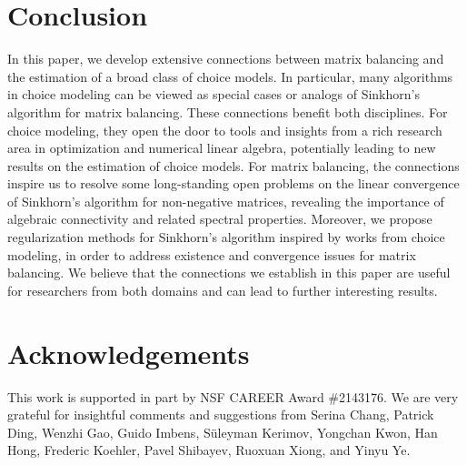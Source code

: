 \section{Conclusion}
In this paper, we develop extensive connections between matrix balancing and the estimation of a broad class of choice models. In particular, many algorithms in choice modeling can be viewed as special cases or analogs of Sinkhorn's algorithm for matrix balancing. These connections benefit both disciplines. For choice modeling, they open the door to tools and insights from a rich research area in optimization and numerical linear algebra, potentially leading to new  results on the estimation of choice models. For matrix balancing, the connections inspire us to resolve some long-standing open problems on the linear convergence of Sinkhorn's algorithm for non-negative matrices, revealing the importance of algebraic connectivity and related spectral properties. Moreover, we propose regularization methods for Sinkhorn's algorithm inspired by works from choice modeling, in order to address existence and convergence issues for matrix balancing. We believe that the connections we establish in this paper are useful for researchers from both domains and can lead to further interesting results. 

\section{Acknowledgements}
This work is supported in part by NSF CAREER Award \#2143176. We are very grateful for insightful comments and suggestions from Serina Chang, Patrick Ding, Wenzhi Gao, Guido Imbens, S{\"u}leyman Kerimov, Yongchan Kwon, Han Hong, Frederic Koehler, Pavel Shibayev, Ruoxuan Xiong, and Yinyu Ye. %
